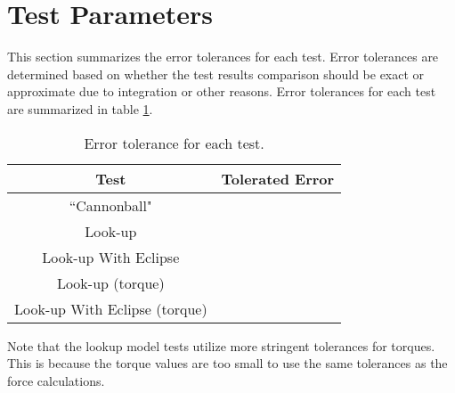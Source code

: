\section{Test Parameters}

This section summarizes the error tolerances for each test. Error tolerances are determined based on whether the test results comparison should be exact or approximate due to integration or other reasons. Error tolerances for each test are summarized in table \ref{tab:errortol}. 

\begin{table}[htbp]
	\caption{Error tolerance for each test.}
	\label{tab:errortol}
	\centering \fontsize{10}{10}\selectfont
	\begin{tabular}{ c | c } %
		\hline
		\textbf{Test}   	      	               & \textbf{Tolerated Error} 						           \\ \hline
		``Cannonball"                           &	 			  \\ \hline
		Look-up						                & 		   				\\ \hline
		Look-up With Eclipse	             &     \\ \hline
		Look-up	(torque)			               & 		   				\\ \hline
	    Look-up With Eclipse (torque)	&     \\ \hline
	\end{tabular}
\end{table}

\noindent Note that the lookup model tests utilize more stringent tolerances for torques. This is because the torque values are too small to use the same tolerances as the force calculations.